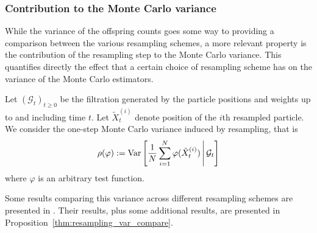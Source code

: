 \subsubsection{Contribution to the Monte Carlo variance}

While the variance of the offspring counts goes some way to providing a comparison between the various resampling schemes, a more relevant property is the contribution of the resampling step to the Monte Carlo variance.
This quantifies directly the effect that a certain choice of resampling scheme has on the variance of the Monte Carlo estimators.

Let $(\mathcal{G}_t)_{t\geq0}$ be the filtration generated by the particle positions and weights up to and including time $t$.
Let $\tilde{X}_t^{(i)}$ denote position of the $i$th resampled particle.
We consider the one-step Monte Carlo variance induced by resampling, that is
\begin{equation}\label{eq:resamplingMCvariance}
\rho(\varphi) 
:= \operatorname{Var}\left[ \frac{1}{N} \sum_{i=1}^N \varphi (\tilde{X}_t^{(i)}) \,\middle|\, \mathcal{G}_t \right]
\end{equation}
where $\varphi$ is an arbitrary test function.

Some results comparing this variance across different resampling schemes are presented in \textcite{douc2005}. 
Their results, plus some additional results, are presented in Proposition~\ref{thm:resampling_var_compare}.

